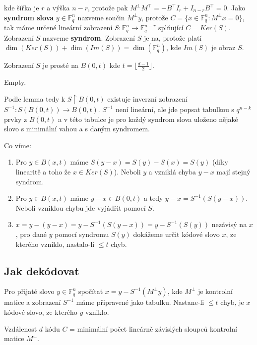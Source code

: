 kde šířka je $r$ a výška $n-r$, protože pak $M^{\bot} M^{\top} = -B^{\top}I_{r} + I_{n-r}B^{\top}=0$. Jako \textbf{syndrom slova} $y \in \mathbb{F}_{q}^{n}$ nazveme součin $M^{\bot}y$, protože $C = \{ x \in \mathbb{F}_{q}^{n}:M^{\bot}x=0 \}$, tak máme určené lineární zobrazení $S:\mathbb{F}_{q}^{n} \to \mathbb{F}_{q}^{n-r}$ splňující $C = Ker(S)$. Zobrazení $S$ nazveme \textbf{syndrom}. Zobrazení $S$ je na, protože platí $\dim(Ker(S)) + \dim(Im(S)) = \dim(\mathbb{F}_{q}^{n})$, kde $Im(S)$ je obraz $S$.

\begin{lemma}
	Zobrazení $S$ je prosté na $B(0,t)$ kde $t=\lfloor \frac{d-1}{2} \rfloor$.
\end{lemma}

\begin{dukaz}
	Empty.
\end{dukaz}

Podle lemma tedy k $S \restriction B(0,t)$ existuje inverzní zobrazení $S^{-1}: S(B(0,t)) \to B(0,t)$. $S^{-1}$ není lineární, ale jde popsat tabulkou s $q^{n-k}$ prvky z $B(0,t)$ a v této tabulce je pro každý syndrom slova uloženo nějaké slovo s minimální vahou a s daným syndromem.

Co víme:

\begin{enumerate}
	\item Pro $y \in B(x,t)$ máme $S(y-x) = S(y) - S(x) = S(y)$ (díky linearitě a toho že $x \in Ker(S)$). Neboli $y$ a vzniklá chyba $y-x$ mají stejný syndrom.
	\item Pro $y \in B(x,t)$ máme $y-x \in B(0,t)$ a tedy $y-x = S^{-1}(S(y-x))$. Neboli vzniklou chybu jde vyjádřit pomocí $S$.
	\item $x = y - (y - x) = y - S^{-1}(S(y-x)) = y - S^{-1}(S(y))$ nezávisý na $x$, pro dané $y$ pomocí syndromu $S(y)$ dokážeme určit kódové slovo $x$, ze kterého vzniklo, nastalo-li $\leq t$ chyb.
\end{enumerate}


\subsection{Jak dekódovat}

Pro přijaté slovo $y \in \mathbb{F}_{q}^{n}$ spočítat $x = y - S^{-1}(M^{\bot}y)$, kde $M^{\bot}$ je kontrolní matice a zobrazení $S^{-1}$ máme připravené jako tabulku. Nastane-li $\leq t$ chyb, je $x$ kódové slovo, ze kterého $y$ vzniklo.

\begin{tvrz}
	Vzdálenost $d$ kódu $C$ = minimální počet lineárně závislých sloupců kontrolní matice $M^{\bot}$.
\end{tvrz}

